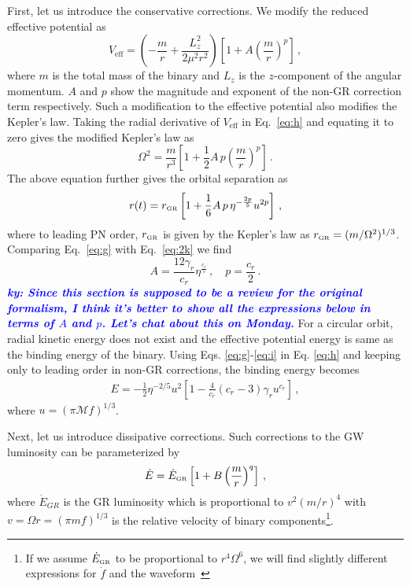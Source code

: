 \documentclass[prd,twocolumn,nofootinbib]{revtex4-1}
\newcommand{\GR}{{\mbox{\tiny GR}}}
\newcommand{\ky}[1]{\textcolor{blue}{\it{\textbf{ky: #1}}} }
\begin{document}
First, let us introduce the conservative corrections. We modify the reduced effective potential as
 \begin{equation}\label{eq:h}
 V_{\text{eff}}=\left(-\frac{m}{r}+\frac{{L}^2_{z}}{2\mu^2r^2}\right)\left[1+A \left(\frac{m}{r}\right)^p\right]\,,
 \end{equation}
where $m$ is the total mass of the binary and $L_{z}$ is the $z$-component of the angular momentum. $A$ and $p$ show the magnitude and exponent of the non-GR correction term respectively. Such a modification to the effective potential also modifies the Kepler's law. Taking the radial derivative of $V_{\text{eff}}$ in Eq.~\eqref{eq:h} and equating it to zero gives the modified Kepler's law as
 \begin{equation}
 \Omega^2=\frac{m}{r^3} \left[1+\frac{1}{2} A \, p\left(\frac{m}{r}\right)^p\right]\,.
 \end{equation}
 The above equation further gives the orbital separation as
 \begin{equation}\label{eq:g}
 r(t)=r_{\GR}\left[1+\frac{1}{6}A\, p\, \eta^{-\frac{2p}{5}}u^{2p}\right]\,,
 \end{equation}
where to leading PN order, $r_{\GR}$ is given by the Kepler's law as $r_{\GR}=(m/\Omega^2)^{1/3}$. Comparing Eq.~\eqref{eq:g} with Eq.~\eqref{eq:2k} we find
\begin{equation}\label{eq:i}
A=\frac{12\gamma_r}{c_r}\eta^{\frac{c_r}{5}}\,, \quad p=\frac{c_r}{2}\,.
\end{equation}
\ky{Since this section is supposed to be a review for the original formalism, I think it's better to show all the expressions below in terms of $A$ and $p$. Let's chat about this on Monday.}
For a circular orbit, radial kinetic energy does not exist and the effective potential energy is same as the binding energy of the binary. Using Eqs. \eqref{eq:g}-\eqref{eq:i} in Eq. \eqref{eq:h} and keeping only to leading order in non-GR corrections, the binding energy becomes
\begin{align}\label{eq:j}
E=-\frac{1}{2}\eta^{-2/5}u^2\left[1-\frac{4}{c_r}(c_r-3)\gamma_ru^{c_r}\right]\,,
\end{align}
where $u=(\pi \mathcal{M} f)^{1/3}$.

Next, let us introduce dissipative corrections. Such corrections to the GW luminosity can be parameterized by
 \begin{equation}\label{eq:a}
 \dot{E}=\dot{E}_{\GR}\left[1+B\left(\frac{m}{r}\right)^q\right]\,,
 \end{equation}
 where $\dot{E}_{GR}$ is the GR luminosity which is proportional to $v^2(m/r)^4$ with $v=\Omega r = (\pi m f)^{1/3}$ is the relative velocity of binary components\footnote{If we assume $\dot{E}_{\GR}$ to be proportional to $r^4\Omega^6$, we will find slightly different expressions for $\dot{f}$ and the waveform~\cite{Chatziioannou:2012rf}}. 
 
\end{document}
